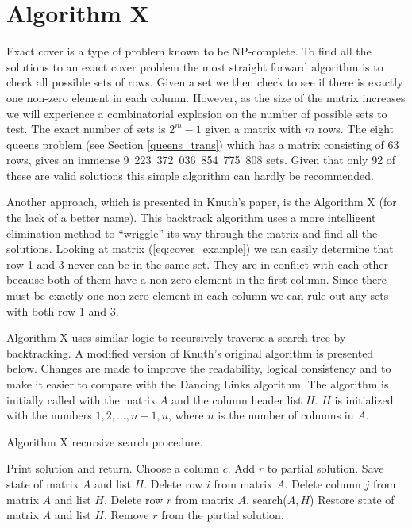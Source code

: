 \section{Algorithm X}
\label{algox}

Exact cover is a type of problem known to be NP-complete.
To find all the solutions to an exact cover problem the most straight forward algorithm is to check all possible sets of rows.
Given a set we then check to see if there is exactly one non-zero element in each column.
However, as the size of the matrix increases we will experience a combinatorial explosion on the number of possible sets to test.
The exact number of sets is $2^{m}-1$ given a matrix with $m$ rows.
The eight queens problem (see Section \ref{queens_trans}) which has a matrix consisting of 63 rows, gives an immense 9~223~372~036~854~775~808 sets.
Given that only 92 of these are valid solutions this simple algorithm can hardly be recommended.

Another approach, which is presented in Knuth's paper, is the Algorithm X (for the lack of a better name).
This backtrack algorithm uses a more intelligent elimination method to ``wriggle'' its way through the matrix and find all the solutions.
Looking at matrix (\ref{eq:cover_example}) we can easily determine that row 1 and 3 never can be in the same set.
They are in conflict with each other because both of them have a non-zero element in the first column.
Since there must be exactly one non-zero element in each column we can rule out any sets with both row 1 and 3.

Algorithm X uses similar logic to recursively traverse a search tree by backtracking.
A modified version of Knuth's original algorithm is presented below.
Changes are made to improve the readability, logical consistency and to make it easier to compare with the Dancing Links algorithm.
The algorithm is initially called with the matrix $A$ and the column header list $H$.
$H$ is initialized with the numbers $1, 2, \ldots, n-1, n$, where $n$ is the number of columns in $A$.

\begin{algorithm}[H]
	\caption{Algorithm X recursive search procedure.}
	\label{algox_code}
	\begin{distribalgo}[1]
				\STATE Print solution and return.  
			\ENDIF
			\STATE Choose a column $c$.
				\STATE Add $r$ to partial solution.
				\STATE Save state of matrix $A$ and list $H$.
						\STATE Delete row $i$ from matrix $A$.
					\ENDFOR
					\STATE Delete column $j$ from matrix $A$ and list $H$.
				\ENDFOR
				\STATE Delete row $r$ from matrix $A$.
				\STATE search($A,H$)
				\STATE Restore state of matrix $A$ and list $H$.
				\STATE Remove $r$ from the partial solution.
			\ENDFOR
		\ENDPROC
	\end{distribalgo}
\end{algorithm}

